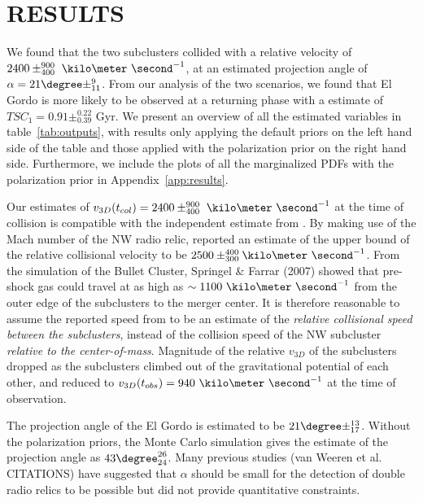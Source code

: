 \section{RESULTS} 
We found that the two subclusters collided with a relative velocity of $2400\pm^{900}_{400}~\kilo\meter~\second^{-1}$, at an estimated projection
angle of $\alpha = 21\degree\pm^{9}_{11}$. From our analysis of the two
scenarios, we found that El Gordo is more likely to be observed at a returning
phase with a estimate of $TSC_1 = 0.91\pm^{0.22}_{0.39}$ Gyr. We present an
overview of all the estimated variables in table~\ref{tab:outputs}, with
results only applying the default priors on the left hand side of the table
and those applied with the polarization prior on the right hand side.
Furthermore, we include the plots of all the marginalized PDFs with the
polarization prior in Appendix~\ref{app:results}. \par 
Our estimates of $v_{3D}(t_{col}) = 2400\pm^{900}_{400}~\kilo\meter~\second^{-1}$ 
at the time of collision is compatible with the independent estimate from \citealt{L13}. 
By making use of the Mach number of the NW radio relic, \cite{L13}
reported an estimate of the upper bound of the relative collisional
velocity to be $2500
\pm^{400}_{300}\kilo\meter~\second^{-1}$. 
From the simulation of the Bullet Cluster, Springel \& Farrar (2007) showed
that pre-shock gas could travel at as high as $\sim
1100~\kilo\meter~\second^{-1}$ from the outer edge of the subclusters to
the merger center.  It is therefore reasonable to assume the reported speed
from \cite{L13} to be an estimate of the {\it relative collisional speed
between the subclusters}, instead of the collision speed of the NW
subcluster {\it relative to the center-of-mass}.
Magnitude of the relative $v_{3D}$ of the subclusters dropped as the
subclusters climbed out of the gravitational potential of each other, and
reduced to $v_{3D}(t_{obs}) = 940~\kilo\meter~\second^{-1}$ at
the time of observation.\par 
The projection angle of the El Gordo is estimated to be
$21\degree \pm^{13}_{17}$. Without the polarization priors, the Monte Carlo
simulation gives the estimate of the projection angle as $43\degree^{26}_{24}$.
Many previous studies (van Weeren et al. CITATIONS) have
suggested that $\alpha$ should be small for the detection of double radio
relics to be possible but did not provide quantitative constraints.    

